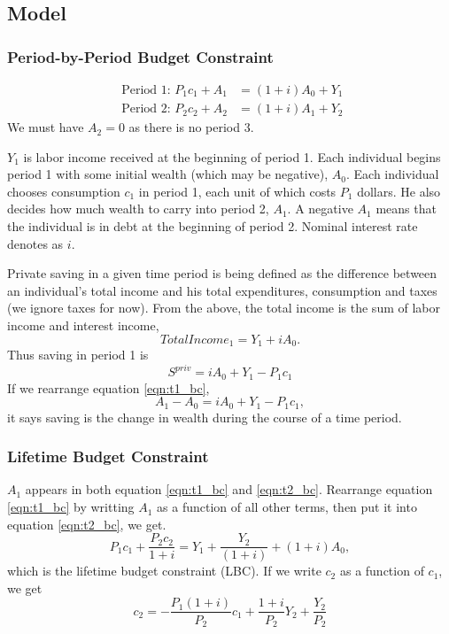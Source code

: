 \documentclass[10pt]{article}
\begin{document}
\subsection{Model}
\subsubsection{Period-by-Period Budget Constraint}

\begin{align}
\text{ Period 1: }P_1c_1 + A_1 &= (1 + i)A_0 + Y_1 \label{eqn:t1_bc}\\
\text{ Period 2: }P_2c_2 + A_2 &= (1 + i)A_1 + Y_2 \label{eqn:t2_bc}
\end{align}
We must have $ A_2 = 0 $ as there is no period 3.



$ Y_1 $ is labor income received at the beginning of period 1. Each individual begins period 1
with some initial wealth (which may be negative), $ A_0 $. 
Each individual chooses consumption $ c_1 $ in period 1, each unit of which costs $ P_1 $ dollars.
He also decides how much wealth to carry into period 2, $ A_1 $. A negative $ A_1 $ means that 
the individual is in debt at the beginning of period 2. Nominal interest rate denotes as $ i $.

Private saving in a given time period is being defined as the difference between an individual's
total income and his total expenditures, consumption and taxes (we ignore taxes for now).
From the above, the total income is the sum of labor income and interest income,
\begin{equation*}
TotalIncome_1 = Y_1 + iA_0.
\end{equation*}
Thus saving in period 1 is
\begin{equation*}
S^{priv} = iA_0 + Y_1 - P_1c_1
\end{equation*}
If we rearrange equation \eqref{eqn:t1_bc},
\begin{equation*}
A_1 - A_0 = iA_0 + Y_1 - P_1c_1,
\end{equation*}
it says saving is the change in wealth during the course of a time period.

\subsubsection{Lifetime Budget Constraint}

$ A_1 $ appears in both equation \eqref{eqn:t1_bc} and \eqref{eqn:t2_bc}. Rearrange equation 
\eqref{eqn:t1_bc} by writting $ A_1 $ as a function of all other terms, then put it into 
equation \eqref{eqn:t2_bc}, we get.
\begin{equation}
P_1c_1 + \frac{P_2c_2}{1 + i} = Y_1 + \frac{Y_2}{(1 + i)} + (1 + i)A_0,
\end{equation}
which is the lifetime budget constraint (LBC).
If we write $ c_2 $ as a function of $ c_1 $, we get
\begin{equation}
c_2 =  - \frac{P_1(1 + i)}{P_2}c_1 + \frac{1 + i}{P_2}Y_2 + \frac{Y_2}{P_2}
\end{equation}
\end{document}
